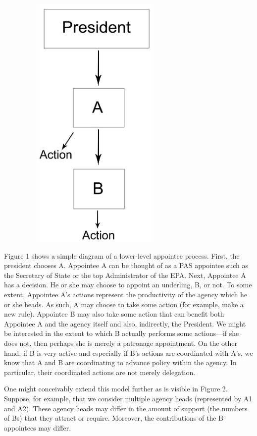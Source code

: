 \documentclass[12pt]{article}
\begin{document}
\begin{figure}
\centering
\includegraphics[height=5in,width=3in]{ModelV1.pdf}
\end{figure}

Figure 1 shows a simple diagram of a lower-level appointee process. First, the president chooses A. Appointee A can be thought of as a PAS appointee such as the Secretary of State or the top Administrator of the EPA. Next, Appointee A has a decision. He or she may choose to appoint an underling, B, or not. To some extent, Appointee A's actions represent the productivity of the agency which he or she heads. As such, A may choose to take some action (for example, make a new rule). Appointee B may also take some action that can benefit both Appointee A and the agency itself and also, indirectly, the President. We might be interested in the extent to which B actually performs some actions---if she does not, then perhaps she is merely a patronage appointment. On the other hand, if B is very active and especially if B's actions are coordinated with A's, we know that A and B are coordinating to advance policy within the agency. In particular, their coordinated actions are not merely delegation. 

One might conceivably extend this model further as is visible in Figure 2. Suppose, for example, that we consider multiple agency heads (represented by A1 and A2). These agency heads may differ in the amount of support (the numbers of Bs) that they attract or require. Moreover, the contributions of the B appointees may differ.
\end{document}
